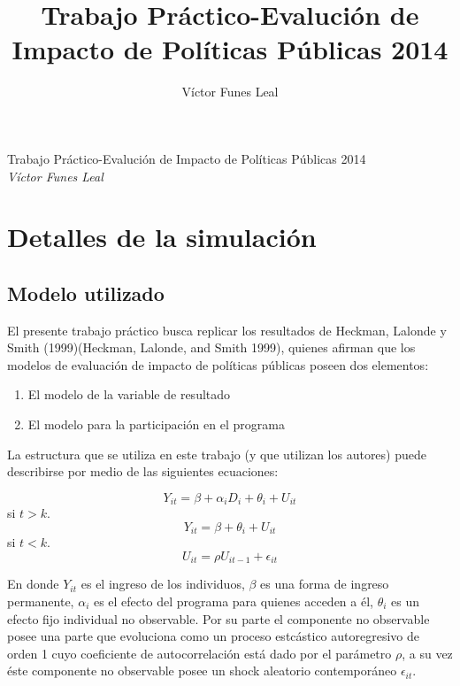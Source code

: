 \documentclass[]{article}
\title{Trabajo Práctico-Evalución de Impacto de Políticas Públicas 2014}
\author{Víctor Funes Leal}
\date{}
\begin{document}
\begin{center}
\huge Trabajo Práctico-Evalución de Impacto de Políticas Públicas 2014 \\[0.2cm]
\large \emph{Víctor Funes Leal}\\[0.1cm]
\normalsize
\end{center}


{
\hypersetup{linkcolor=black}
\setcounter{tocdepth}{2}
\tableofcontents
}
\newpage

\section{Detalles de la simulación}\label{detalles-de-la-simulacion}

\subsection{Modelo utilizado}\label{modelo-utilizado}

El presente trabajo práctico busca replicar los resultados de Heckman,
Lalonde y Smith (1999)(Heckman, Lalonde, and Smith 1999), quienes
afirman que los modelos de evaluación de impacto de políticas públicas
poseen dos elementos:

\begin{enumerate}
\def\labelenumi{\arabic{enumi}.}
\itemsep1pt\parskip0pt
\item
  El modelo de la variable de resultado
\item
  El modelo para la participación en el programa
\end{enumerate}

La estructura que se utiliza en este trabajo (y que utilizan los
autores) puede describirse por medio de las siguientes ecuaciones:

\[ Y_{it}=\beta+\alpha_{i}D_{i}+\theta_{i}+U_{it} \] si $t>k$.
\[ Y_{it}=\beta+\theta_{i}+U_{it} \] si $t<k$.
\[ U_{it}=\rho U_{it-1}+\epsilon_{it}\]

En donde $Y_{it}$ es el ingreso de los individuos, $\beta$ es una forma
de ingreso permanente, $\alpha_{i}$ es el efecto del programa para
quienes acceden a él, $\theta_{i}$ es un efecto fijo individual no
observable. Por su parte el componente no observable posee una parte que
evoluciona como un proceso estcástico autoregresivo de orden 1 cuyo
coeficiente de autocorrelación está dado por el parámetro $\rho$, a su
vez éste componente no observable posee un shock aleatorio contemporáneo
$\epsilon_{it}$.
\end{document}
